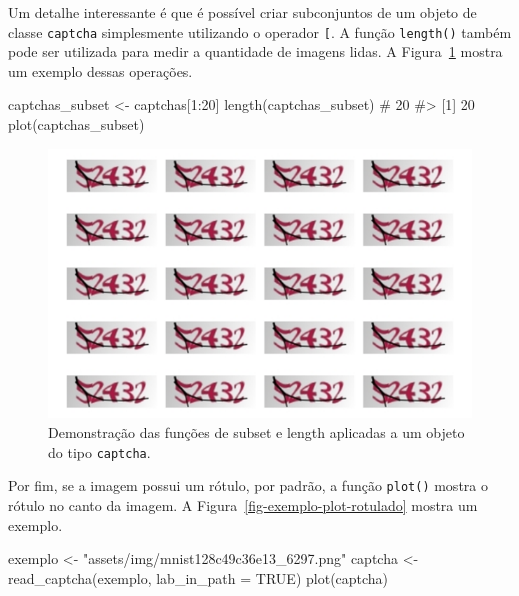 \documentclass[12pt,twoside,brazilian]{book}
\newenvironment{Shaded}{\begin{snugshade}}{\end{snugshade}}
\newcommand{\AttributeTok}[1]{\textcolor[rgb]{0.40,0.45,0.13}{#1}}
\newcommand{\CommentTok}[1]{\textcolor[rgb]{0.37,0.37,0.37}{#1}}
\newcommand{\ConstantTok}[1]{\textcolor[rgb]{0.56,0.35,0.01}{#1}}
\newcommand{\DecValTok}[1]{\textcolor[rgb]{0.68,0.00,0.00}{#1}}
\newcommand{\FunctionTok}[1]{\textcolor[rgb]{0.28,0.35,0.67}{#1}}
\newcommand{\NormalTok}[1]{\textcolor[rgb]{0.00,0.23,0.31}{#1}}
\newcommand{\OtherTok}[1]{\textcolor[rgb]{0.00,0.23,0.31}{#1}}
\newcommand{\SpecialCharTok}[1]{\textcolor[rgb]{0.37,0.37,0.37}{#1}}
\newcommand{\StringTok}[1]{\textcolor[rgb]{0.13,0.47,0.30}{#1}}
\begin{document}
Um detalhe interessante é que é possível criar subconjuntos de um objeto
de classe \texttt{captcha} simplesmente utilizando o operador
\texttt{{[}}. A função \texttt{length()} também pode ser utilizada para
medir a quantidade de imagens lidas. A
Figura~\ref{fig-exemplo-plot-multi-varias-subset} mostra um exemplo
dessas operações.

\begin{Shaded}
\begin{Highlighting}[]
\NormalTok{captchas\_subset }\OtherTok{\textless{}{-}}\NormalTok{ captchas[}\DecValTok{1}\SpecialCharTok{:}\DecValTok{20}\NormalTok{]}
\FunctionTok{length}\NormalTok{(captchas\_subset) }\CommentTok{\# 20}
\CommentTok{\#\textgreater{} [1] 20}
\FunctionTok{plot}\NormalTok{(captchas\_subset)}
\end{Highlighting}
\end{Shaded}

\begin{figure}[H]

{\centering \includegraphics{./resultados_files/figure-pdf/fig-exemplo-plot-multi-varias-subset-1.pdf}

}

\caption{\label{fig-exemplo-plot-multi-varias-subset}Demonstração das
funções de subset e length aplicadas a um objeto do tipo
\texttt{captcha}.}

\end{figure}

Por fim, se a imagem possui um rótulo, por padrão, a função
\texttt{plot()} mostra o rótulo no canto da imagem. A
Figura~\ref{fig-exemplo-plot-rotulado} mostra um exemplo.

\begin{Shaded}
\begin{Highlighting}[]
\NormalTok{exemplo }\OtherTok{\textless{}{-}} \StringTok{"assets/img/mnist128c49c36e13\_6297.png"}
\NormalTok{captcha }\OtherTok{\textless{}{-}} \FunctionTok{read\_captcha}\NormalTok{(exemplo, }\AttributeTok{lab\_in\_path =} \ConstantTok{TRUE}\NormalTok{)}
\FunctionTok{plot}\NormalTok{(captcha)}
\end{Highlighting}
\end{Shaded}
\end{document}

